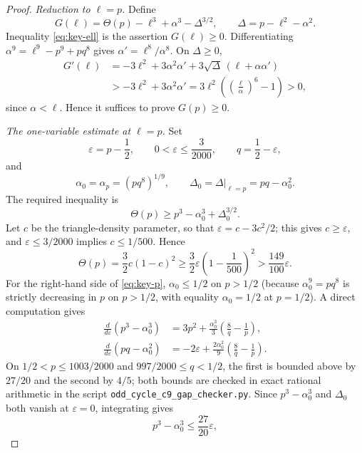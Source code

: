 \documentclass[11pt]{article}
\newcommand{\eps}{\varepsilon}
\begin{document}
\begin{proof}
\smallskip\noindent\emph{Reduction to $\ell=p$.}
Define
\[
        G(\ell)=\Theta(p)-\ell^3+\alpha^3-\Delta^{3/2},
        \qquad \Delta=p-\ell^2-\alpha^2.
\]
Inequality \eqref{eq:key-ell} is the assertion $G(\ell)\ge0$.  Differentiating $\alpha^9=\ell^9-p^9+pq^8$ gives $\alpha'=\ell^8/\alpha^8$.  On $\Delta\ge0$,
\[
\begin{aligned}
        G'(\ell)
        &=-3\ell^2+3\alpha^2\alpha'+3\sqrt{\Delta}\,(\ell+\alpha\alpha') \\
        &> -3\ell^2+3\alpha^2\alpha'
        =3\ell^2\left(\left(\frac{\ell}{\alpha}\right)^6-1\right)>0,
\end{aligned}
\]
since $\alpha<\ell$.  Hence it suffices to prove $G(p)\ge0$.

\smallskip\noindent\emph{The one-variable estimate at $\ell=p$.}
Set
\[
        \eps=p-\frac12,
        \qquad 0<\eps\le\frac{3}{2000},
        \qquad q=\frac12-\eps,
\]
and
\[
        \alpha_0=\alpha_p=(pq^8)^{1/9},
        \qquad \Delta_0=\Delta|_{\ell=p}=pq-\alpha_0^2.
\]
The required inequality is
\begin{equation}\label{eq:key-p}
        \Theta(p)\ge p^3-\alpha_0^3+\Delta_0^{3/2}.
\end{equation}
Let $c$ be the triangle-density parameter, so that $\eps=c-3c^2/2$; this gives $c\ge\eps$, and $\eps\le3/2000$ implies $c\le1/500$.  Hence
\begin{equation}\label{eq:theta-lower}
        \Theta(p)=\frac32 c(1-c)^2
        \ge \frac32\eps\left(1-\frac1{500}\right)^2
        >\frac{149}{100}\eps.
\end{equation}
For the right-hand side of \eqref{eq:key-p}, $\alpha_0\le1/2$ on $p>1/2$ (because $\alpha_0^9=pq^8$ is strictly decreasing in $p$ on $p>1/2$, with equality $\alpha_0=1/2$ at $p=1/2$).  A direct computation gives
\[
\begin{aligned}
\frac{d}{d\eps}(p^3-\alpha_0^3)
&=3p^2+\frac{\alpha_0^3}{3}\left(\frac8q-\frac1p\right),\\
\frac{d}{d\eps}(pq-\alpha_0^2)
&=-2\eps+\frac{2\alpha_0^2}{9}\left(\frac8q-\frac1p\right).
\end{aligned}
\]
On $1/2<p\le1003/2000$ and $997/2000\le q<1/2$, the first is bounded above by $27/20$ and the second by $4/5$; both bounds are checked in exact rational arithmetic in the script \texttt{odd\_cycle\_c9\_gap\_checker.py}.  Since $p^3-\alpha_0^3$ and $\Delta_0$ both vanish at $\eps=0$, integrating gives
\begin{equation}\label{eq:linear-upper}
        p^3-\alpha_0^3\le \frac{27}{20}\eps,

\end{equation}
\end{proof}
\end{document}
